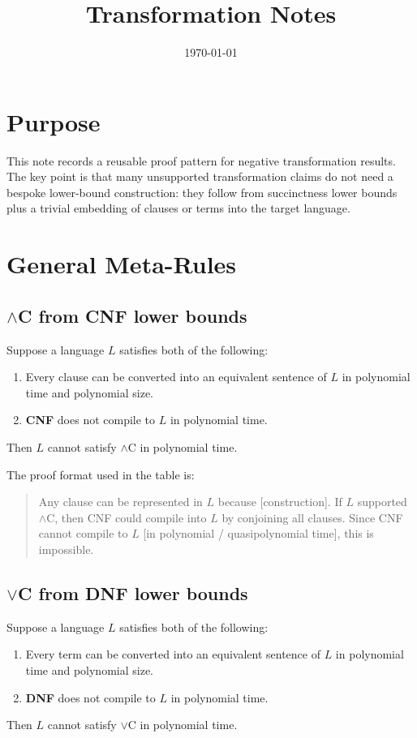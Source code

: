 \documentclass[11pt]{article}
\title{Transformation Notes}
\date{\today}
\newcommand{\langref}[1]{\textbf{#1}}
\begin{document}
\maketitle

\section{Purpose}
This note records a reusable proof pattern for negative transformation results.
The key point is that many unsupported transformation claims do not need a bespoke lower-bound construction: they follow from succinctness lower bounds plus a trivial embedding of clauses or terms into the target language.

\section{General Meta-Rules}
\subsection{$\land$C from CNF lower bounds}
Suppose a language $L$ satisfies both of the following:
\begin{enumerate}[noitemsep]
  \item Every clause can be converted into an equivalent sentence of $L$ in polynomial time and polynomial size.
  \item \langref{CNF} does not compile to $L$ in polynomial time.
\end{enumerate}
Then $L$ cannot satisfy $\land$C in polynomial time.

The proof format used in the table is:
\begin{quote}
Any clause can be represented in $L$ because [construction]. If $L$ supported $\land$C, then CNF could compile into $L$ by conjoining all clauses. Since CNF cannot compile to $L$ [in polynomial / quasipolynomial time], this is impossible.
\end{quote}

\subsection{$\lor$C from DNF lower bounds}
Suppose a language $L$ satisfies both of the following:
\begin{enumerate}[noitemsep]
  \item Every term can be converted into an equivalent sentence of $L$ in polynomial time and polynomial size.
  \item \langref{DNF} does not compile to $L$ in polynomial time.
\end{enumerate}
Then $L$ cannot satisfy $\lor$C in polynomial time.
\end{document}
